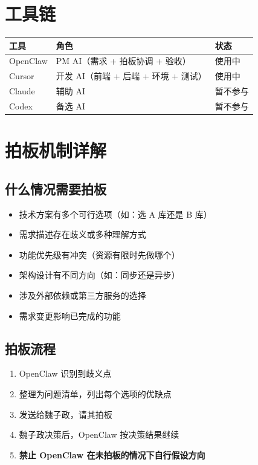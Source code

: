 \documentclass[11pt,a4paper]{article}
\begin{document}
\section{工具链}

\begin{table}[h]
\centering
\begin{tabularx}{\linewidth}{lXX}
\toprule
\textbf{工具} & \textbf{角色} & \textbf{状态} \\
\midrule
OpenClaw & PM AI（需求 + 拍板协调 + 验收） & \textcolor{success}{使用中} \\
Cursor & 开发 AI（前端 + 后端 + 环境 + 测试） & \textcolor{success}{使用中} \\
Claude & 辅助 AI & \textcolor{danger}{暂不参与} \\
Codex & 备选 AI & \textcolor{danger}{暂不参与} \\
\bottomrule
\end{tabularx}
\end{table}

\section{拍板机制详解}

\subsection{什么情况需要拍板}

\begin{itemize}[nosep]
  \item 技术方案有多个可行选项（如：选 A 库还是 B 库）
  \item 需求描述存在歧义或多种理解方式
  \item 功能优先级有冲突（资源有限时先做哪个）
  \item 架构设计有不同方向（如：同步还是异步）
  \item 涉及外部依赖或第三方服务的选择
  \item 需求变更影响已完成的功能
\end{itemize}

\subsection{拍板流程}

\begin{enumerate}[nosep]
  \item OpenClaw 识别到歧义点
  \item 整理为问题清单，列出每个选项的优缺点
  \item 发送给魏子政，请其拍板
  \item 魏子政决策后，OpenClaw 按决策结果继续
  \item \textbf{禁止 OpenClaw 在未拍板的情况下自行假设方向}
\end{enumerate}
\end{document}
